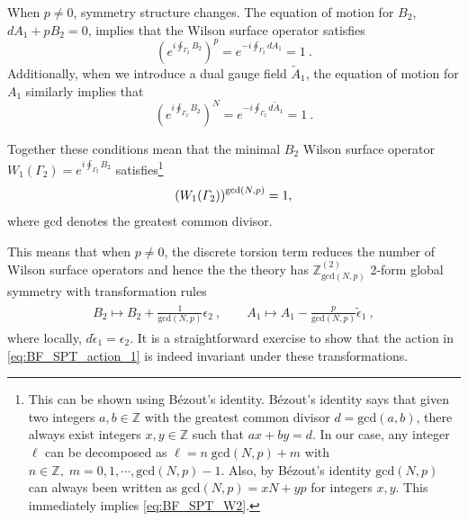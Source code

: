 \documentclass[11pt]{article}
\newcommand{\eq}[1]{\begin{align}\begin{split}#1\end{split}\end{align}}
\def\IZ{{\mathbb{Z}}}
\def\beq{\begin{equation}}
\def\eeq{\end{equation}}
\begin{document}
When $p \neq 0$, symmetry structure changes. 
The equation of motion for $B_2$, $d A_1 + p B_2 = 0$,  implies that the Wilson surface operator satisfies
%
\beq
\left( e^{i \oint_{\Gamma_2} B_2} \right)^p = e^{-i \oint_{\Gamma_2} d A_1} = 1~.
\label{eq:BF_SPT_W2_cut_p}
\eeq
%
Additionally, when we introduce a dual gauge field $\tilde{A}_1$, the equation of motion for $A_1$ similarly implies that
%
\beq
\left( e^{i \oint_{\Gamma_2} B_2} \right)^N = e^{-i \oint_{\Gamma_2} d \tilde{A}_1} = 1~.
\label{eq:BF_SPT_W2_cut_N}
\eeq
%

Together these conditions mean that the minimal $B_2$ Wilson surface operator $W_1 (\Gamma_2) = e^{i \oint_{\Gamma_2} B_2}$ satisfies\footnote{This can be shown using B\'{e}zout's identity. B\'{e}zout's identity says that given two integers $a, b \in \IZ$ with the greatest common divisor $d = \text{gcd} (a, b)$, there always exist integers $x, y \in \IZ$ such that $ax + by = d$. In our case, any integer $\ell$ can be decomposed as $\ell = n \; \text{gcd} (N,p) + m$ with $n \in \IZ, \;m =0, 1, \cdots , \text{gcd} (N,p) - 1$. Also, by B\'{e}zout's identity $\text{gcd} (N,p)$ can always been written as $\text{gcd} (N,p) = x N + y p$ for integers $x, y$. This immediately implies \eqref{eq:BF_SPT_W2}. }
%
\beq
\left( W_1 (\Gamma_2) \right)^{{\rm gcd} (N,p)} = 1,
\label{eq:BF_SPT_W2}
\eeq
%
where $\text{gcd}$ denotes the greatest common divisor.


This means that when $p\neq 0$, the discrete torsion term reduces the number of Wilson surface operators and hence the  
the theory has $\IZ_{\text{gcd}(N,p)}^{(2)}$ 2-form global symmetry with transformation rules 
\eq{
B_2 \longmapsto B_2 + \frac{1}{\text{gcd}(N,p)} \epsilon_2~,\qquad
A_1 \longmapsto A_1 - \frac{p}{\text{gcd}(N,p)} \tilde{\epsilon}_1~,
}
%
where locally, $d \tilde{\epsilon}_1 = \epsilon_2$. It is a straightforward exercise to show that the action in \eqref{eq:BF_SPT_action_1}  
is indeed invariant under these transformations.
\end{document}
